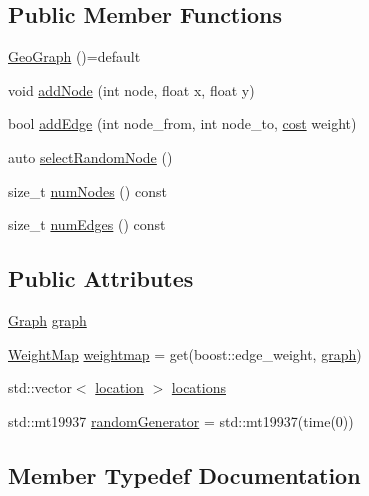 \subsection*{Public Member Functions}
\begin{DoxyCompactItemize}
\item 
\mbox{\hyperlink{class_geo_graph_a896afe4224d4b67108488b5416f3773c}{Geo\+Graph}} ()=default
\item 
void \mbox{\hyperlink{class_geo_graph_acc7604fb5f8916e33786f6cc4b25b154}{add\+Node}} (int node, float x, float y)
\item 
bool \mbox{\hyperlink{class_geo_graph_a34e34580c4d4e29b1462aba375045628}{add\+Edge}} (int node\+\_\+from, int node\+\_\+to, \mbox{\hyperlink{class_geo_graph_aeab86df7ed72508486bdae447ae14fa7}{cost}} weight)
\item 
auto \mbox{\hyperlink{class_geo_graph_ae796c8a1012d1c3d1550a5647cfaa45f}{select\+Random\+Node}} ()
\item 
size\+\_\+t \mbox{\hyperlink{class_geo_graph_aea757f46d2548fbdd8efe5220aa30896}{num\+Nodes}} () const
\item 
size\+\_\+t \mbox{\hyperlink{class_geo_graph_a2689262db53cb66711fd313aa4c6b730}{num\+Edges}} () const
\end{DoxyCompactItemize}
\subsection*{Public Attributes}
\begin{DoxyCompactItemize}
\item 
\mbox{\hyperlink{class_geo_graph_a4f8c3bf1eb9f30bc227f300d7460debb}{Graph}} \mbox{\hyperlink{class_geo_graph_ac58f6685615da10b71249b20e53932c9}{graph}}
\item 
\mbox{\hyperlink{class_geo_graph_abc1f115f69f62ae60f5f0f71f7725a96}{Weight\+Map}} \mbox{\hyperlink{class_geo_graph_a8c13836f51794be05e9900814a458c6a}{weightmap}} = get(boost\+::edge\+\_\+weight, \mbox{\hyperlink{class_geo_graph_ac58f6685615da10b71249b20e53932c9}{graph}})
\item 
std\+::vector$<$ \mbox{\hyperlink{struct_geo_graph_1_1location}{location}} $>$ \mbox{\hyperlink{class_geo_graph_ac64769457cf6a23a877a03262b44c517}{locations}}
\item 
std\+::mt19937 \mbox{\hyperlink{class_geo_graph_abb9d028dbedb4b6544f9a19c167774ba}{random\+Generator}} = std\+::mt19937(time(0))
\end{DoxyCompactItemize}


\subsection{Member Typedef Documentation}
\mbox{\label{class_geo_graph_aeab86df7ed72508486bdae447ae14fa7}} 
